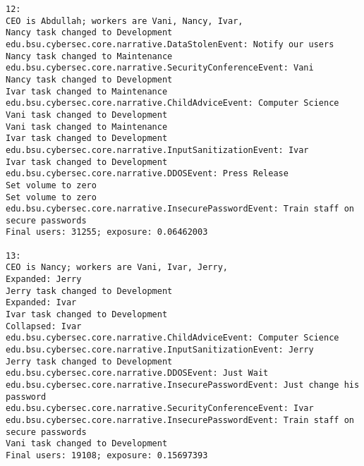 \begin{verbatim}
12: 
CEO is Abdullah; workers are Vani, Nancy, Ivar, 
Nancy task changed to Development
edu.bsu.cybersec.core.narrative.DataStolenEvent: Notify our users
Nancy task changed to Maintenance
edu.bsu.cybersec.core.narrative.SecurityConferenceEvent: Vani
Nancy task changed to Development
Ivar task changed to Maintenance
edu.bsu.cybersec.core.narrative.ChildAdviceEvent: Computer Science
Vani task changed to Development
Vani task changed to Maintenance
Ivar task changed to Development
edu.bsu.cybersec.core.narrative.InputSanitizationEvent: Ivar
Ivar task changed to Development
edu.bsu.cybersec.core.narrative.DDOSEvent: Press Release
Set volume to zero
Set volume to zero
edu.bsu.cybersec.core.narrative.InsecurePasswordEvent: Train staff on secure passwords
Final users: 31255; exposure: 0.06462003

13:
CEO is Nancy; workers are Vani, Ivar, Jerry, 
Expanded: Jerry
Jerry task changed to Development
Expanded: Ivar
Ivar task changed to Development
Collapsed: Ivar
edu.bsu.cybersec.core.narrative.ChildAdviceEvent: Computer Science
edu.bsu.cybersec.core.narrative.InputSanitizationEvent: Jerry
Jerry task changed to Development
edu.bsu.cybersec.core.narrative.DDOSEvent: Just Wait
edu.bsu.cybersec.core.narrative.InsecurePasswordEvent: Just change his password
edu.bsu.cybersec.core.narrative.SecurityConferenceEvent: Ivar
edu.bsu.cybersec.core.narrative.InsecurePasswordEvent: Train staff on secure passwords
Vani task changed to Development
Final users: 19108; exposure: 0.15697393
\end{verbatim}
